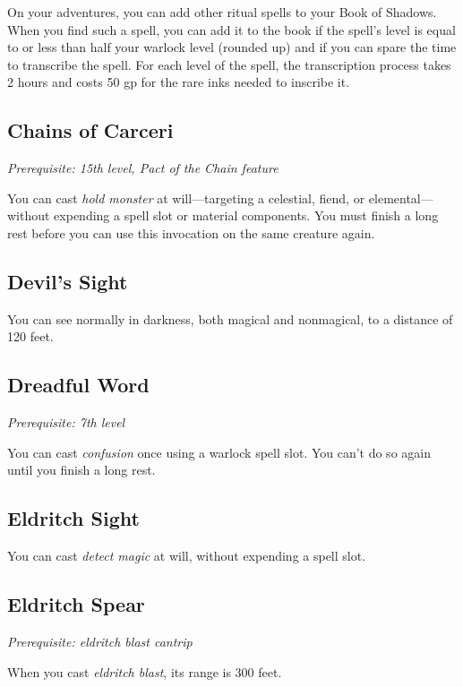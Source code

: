 On your adventures, you can add other ritual spells to your Book of Shadows. When you find such a spell, you can add it to the book if the spell's level is equal to or less than half your warlock level (rounded up) and if you can spare the time to transcribe the spell. For each level of the spell, the transcription process takes 2 hours and costs 50 gp for the rare inks needed to inscribe it.

\subsection{Chains of Carceri}

\textit{Prerequisite: 15th level, Pact of the Chain feature}

You can cast \textit{hold monster} at will—targeting a celestial, fiend, or elemental—without expending a spell slot or material components. You must finish a long rest before you can use this invocation on the same creature again.

\subsection{Devil's Sight}

You can see normally in darkness, both magical and nonmagical, to a distance of 120 feet.

\subsection{Dreadful Word}

\textit{Prerequisite: 7th level}

You can cast \textit{confusion} once using a warlock spell slot. You can't do so again until you finish a long rest.

\subsection{Eldritch Sight}

You can cast \textit{detect magic} at will, without expending a spell slot.

\subsection{Eldritch Spear}

\textit{Prerequisite: eldritch blast cantrip}

When you cast \textit{eldritch blast}, its range is 300 feet.

